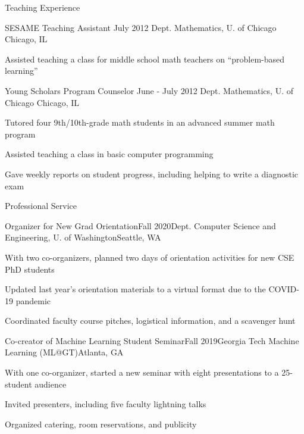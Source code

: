 \documentclass{resume} %
\begin{document}
\begin{rSection}{Teaching Experience}
\begin{rSubsection}{ SESAME Teaching Assistant}{ July 2012}{ Dept. Mathematics, U. of Chicago}{ Chicago, IL}
\item Assisted teaching a class for middle school math teachers on ``problem-based learning''
\end{rSubsection}

\begin{rSubsection}{ Young Scholars Program Counselor}{ June - July 2012}{ Dept. Mathematics, U. of Chicago}{ Chicago, IL}
\item Tutored four 9th/10th-grade math students in an advanced summer math program
\item Assisted teaching a class in basic computer programming
\item Gave weekly reports on student progress, including helping to write a diagnostic exam
\end{rSubsection}

\end{rSection}

\begin{rSection}{Professional Service}

\begin{rSubsection}{Organizer for New Grad Orientation}{Fall 2020}{Dept. Computer Science and Engineering, U. of Washington}{Seattle, WA}
\item With two co-organizers, planned two days of orientation activities for new CSE PhD students
\item Updated last year's orientation materials to a virtual format due to the COVID-19 pandemic
\item Coordinated faculty course pitches, logistical information, and a scavenger hunt
\end{rSubsection}

\begin{rSubsection}{Co-creator of Machine Learning Student Seminar}{Fall 2019}{Georgia Tech Machine Learning (ML@GT)}{Atlanta, GA}
\item With one co-organizer, started a new seminar with eight presentations to a 25-student audience
\item Invited presenters, including five faculty lightning talks
\item Organized catering, room reservations, and publicity
\end{rSubsection}

\end{rSection}
\end{document}
